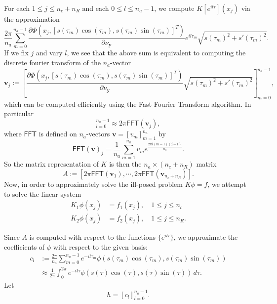 \documentclass[11pt]{amsart}
\theoremstyle{definition}
\theoremstyle{definition}
\theoremstyle{definition}
\newcommand{\paren}[1]{\left ( #1\right )}
\begin{document}
For each $1 \leq j \leq n_{c} + n_{R}$ and each $0 \leq l \leq n_{a}-1$, we compute $K[e^{il\tau}](x_{j})$ via the approximation
\begin{equation*}
\frac{2\pi}{n_{a}}\sum_{m=0}^{n_{a}-1} \frac{\partial \Phi( x_{j}, [s(\tau_{m})\cos\paren{\tau_{m}}, s(\tau_{m})\sin\paren{\tau_{m}}]^{T})}{\partial \nu_{\mathbf{y}}} e^{il \tau_{m}}\sqrt{s(\tau_{m})^{2} + s'(\tau_{m})^{2}}.
\end{equation*}
If we fix $j$ and vary $l$, we see that the above sum is equivalent to computing the discrete fourier transform of the $n_{a}$-vector
\begin{equation}
\mathbf{v}_{j} := \left[\frac{\partial \Phi( x_{j}, [s(\tau_{m})\cos\paren{\tau_{m}}, s(\tau_{m})\sin\paren{\tau_{m} }]^{T})}{\partial \nu_{\mathbf{y}}}\sqrt{s(\tau_{m})^{2} + s'(\tau_{m})^{2}}\right]_{m=0}^{n_{a}-1}, \label{eq:vj}
\end{equation}
which can be computed efficiently using the Fast Fourier Transform algorithm. In particular
\begin{equation*}
[K\{e^{il\tau}\}(x_{j})]_{l=0}^{n_{a}-1} \approx 2\pi \mathsf{FFT}(\mathbf{v}_{j}),
\end{equation*}
where $\mathsf{FFT}$ is defined on $n_{a}$-vectors $\mathbf{v} = [v_{m}]_{m=1}^{n_{a}}$ by
\begin{equation}
\mathsf{FFT}(\mathbf{v})_{j} = \frac{1}{n_{a}}\sum_{m=1}^{n_{a}}v_{m}e^{\frac{2\pi i (m-1)(j-1)}{n_{a}}}.
\label{eq:fft}
\end{equation}
So the matrix representation of $K$ is then the $n_{a} \times (n_{c} + n_{R})$ matrix
\begin{equation}
A := [2\pi \mathsf{FFT}(\mathbf{v}_{1}), \cdots ,2\pi \mathsf{FFT}(\mathbf{v}_{n_{c}+n_{R}})].
\end{equation}
Now, in order to approximately solve the ill-posed problem $K\phi = f$, we attempt to solve the linear system
\begin{align*}
K_{1}\phi(x_{j}) & = f_{1}(x_{j}), \quad 1 \leq j \leq n_{c}\\
K_{2}\phi(x_{j}) & = f_{2}(x_{j}), \quad 1 \leq j \leq n_{R}.
\end{align*}

Since $A$ is computed with respect to the functions $\{e^{il\tau}\}$, we approximate the coefficients of $\phi$ with respect to the given basis:
\begin{align*}
c_{l} & := \frac{2\pi}{n_{a}}\sum_{m=0}^{n_{a}-1}e^{-il\tau_{m}}\phi(s(\tau_{m})\cos(\tau_{m}), s(\tau_{m})\sin(\tau_{m}))\\
& \approx \frac{1}{2\pi}\int_{0}^{2\pi} e^{-il\tau}\phi(s(\tau)\cos(\tau), s(\tau)\sin(\tau))\,d\tau.
\end{align*}
Let
\begin{equation*}
h = [c_{l}]_{l=0}^{n_{a}-1}.
\end{equation*}
\end{document}

